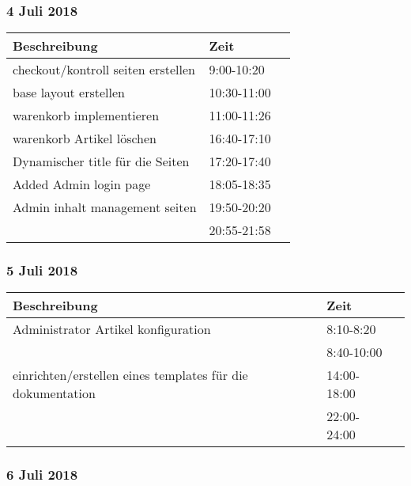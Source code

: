 \documentclass[a4paper, 11pt]{article}
\begin{document}
\subsubsection{4 Juli 2018}

\begin{tabular}{llr}
\toprule
Beschreibung & Zeit \\
\midrule
checkout/kontroll seiten erstellen & 9:00-10:20 \\
base layout erstellen & 10:30-11:00 \\
warenkorb implementieren & 11:00-11:26 \\
warenkorb Artikel löschen & 16:40-17:10 \\
Dynamischer title für die Seiten & 17:20-17:40 \\
Added Admin login page & 18:05-18:35 \\
Admin inhalt management seiten & 19:50-20:20 \\
 & 20:55-21:58 \\
\bottomrule
\end{tabular}

\subsubsection{5 Juli 2018}

\begin{tabular}{llr}
\toprule
Beschreibung & Zeit \\
\midrule
Administrator Artikel konfiguration & 8:10-8:20 \\
 & 8:40-10:00 \\
einrichten/erstellen eines templates für die dokumentation & 14:00-18:00 \\
 & 22:00-24:00 \\
\bottomrule
\end{tabular}

\subsubsection{6 Juli 2018}
\end{document}
